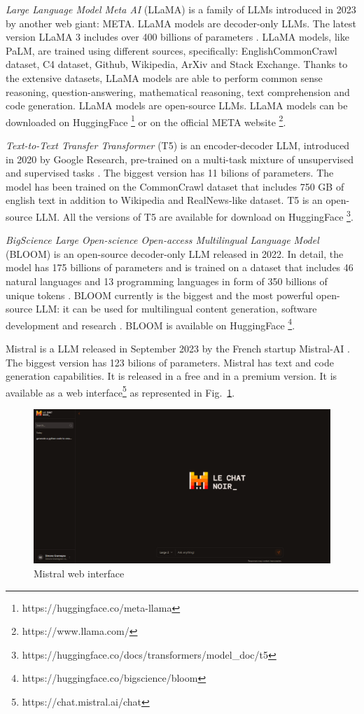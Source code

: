\textit{Large Language Model Meta AI} (LLaMA) is a family of LLMs introduced in 2023 by another web giant: META.
LLaMA models are decoder-only LLMs.
The latest version LLaMA 3 includes over 400 billions of parameters \cite{llama3_intro}.
LLaMA models, like PaLM, are trained using different sources, specifically: EnglishCommonCrawl dataset, C4 dataset, Github, Wikipedia, ArXiv and Stack Exchange.
Thanks to the extensive datasets, LLaMA models are able to perform common sense reasoning, question-answering, mathematical reasoning, text comprehension and code generation.
LLaMA models are open-source LLMs.
LLaMA models can be downloaded on HuggingFace \footnote{https://huggingface.co/meta-llama} or on the official META website \footnote{https://www.llama.com/}.


\textit{Text-to-Text Transfer Transformer} (T5) is an encoder-decoder LLM, introduced in 2020 by Google Research, pre-trained on a multi-task mixture of unsupervised and supervised tasks \cite{raffel2020exploring}.
The biggest version has 11 bilions of parameters.
The model has been trained on the CommonCrawl dataset that includes 750 GB of english text in addition to Wikipedia and RealNews-like dataset.
T5 is an open-source LLM.
All the versions of T5 are available for download on HuggingFace \footnote{https://huggingface.co/docs/transformers/model\_doc/t5}.

\textit{BigScience Large Open-science Open-access Multilingual Language Model} (BLOOM) is an open-source decoder-only LLM released in 2022.
In detail, the model has 175 billions of parameters and is trained on a dataset that includes 46 natural languages and 13 programming languages in form of 350 billions of unique tokens \cite{le2023bloom}.
BLOOM currently is the biggest and the most powerful open-source LLM: it can be used for multilingual content generation, software development and research \cite{exploring_bloom}.
BLOOM is available on HuggingFace \footnote{https://huggingface.co/bigscience/bloom}.

Mistral is a LLM released in September 2023 by the French startup Mistral-AI \cite{jiang2023mistral}.
The biggest version has 123 bilions of parameters.
Mistral has text and code generation capabilities.
It is released in a free and in a premium version.
It is available as a web interface\footnote{https://chat.mistral.ai/chat} as represented in Fig.~\ref{fig_20}.
\begin{figure}[H]
    \centering
    \includegraphics[width=0.9\linewidth]{Figures/fig_20.png}
    \caption{Mistral web interface}
    \label{fig_20}
\end{figure}

